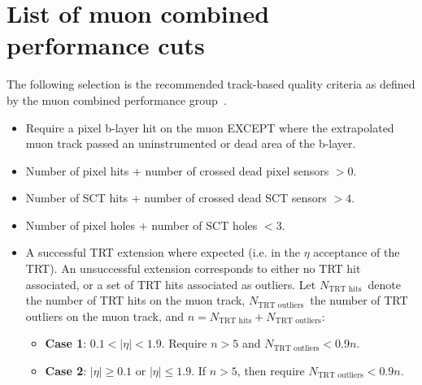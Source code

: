 \newcommand{\trtHits}{\ensuremath{N_{\textrm{TRT hits}}}}
\newcommand{\trtOut}{\ensuremath{N_{\textrm{TRT outliers}}}}

\chapter{List of muon combined performance cuts} \label{app:CalibrationMCPCuts}

The following selection is the recommended track-based quality criteria as defined by the muon combined performance group~\cite{Calibration:MCP2012}.

\begin{itemize}
  \item Require a pixel b-layer hit on the muon EXCEPT where the extrapolated muon track passed an uninstrumented or dead area of the b-layer.
  \item Number of pixel hits + number of crossed dead pixel sensors $>0$.
  \item Number of SCT hits + number of crossed dead SCT sensors $>4$.
  \item Number of pixel holes + number of SCT holes $<3$.
  \item A successful TRT extension where expected (i.e. in the $\eta$ acceptance of the TRT). An unsuccessful extension corresponds to either no TRT hit associated, or a set of TRT hits associated as outliers. Let \trtHits\ denote the number of TRT hits on the muon track, \trtOut\ the number of TRT outliers on the muon track, and $n=\trtHits + \trtOut$:
  \begin{itemize}
    \item \textbf{Case 1}: $0.1<|\eta|<1.9$. Require $n>5$ and $\trtOut<0.9n$.
    \item \textbf{Case 2}: $|\eta|\geq0.1$ or $|\eta|\leq1.9$. If $n>5$, then require $\trtOut<0.9n$.
  \end{itemize}
\end{itemize}
